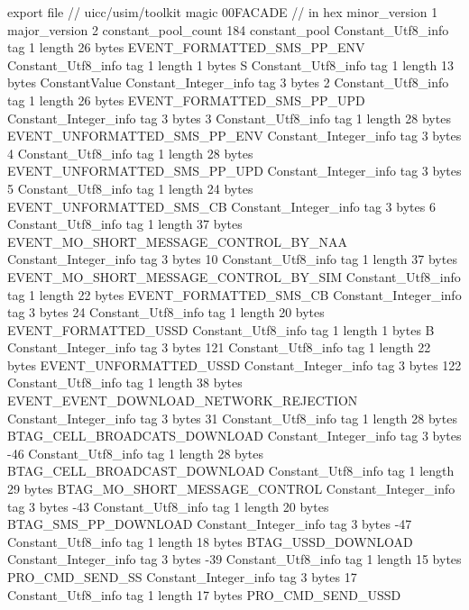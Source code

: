 export file {		// uicc/usim/toolkit
	magic	00FACADE		 // in hex
	minor_version	1
	major_version	2
	constant_pool_count	184
	constant_pool {
		Constant_Utf8_info {
			tag	1
			length	26
			bytes	EVENT_FORMATTED_SMS_PP_ENV
		}
		Constant_Utf8_info {
			tag	1
			length	1
			bytes	S
		}
		Constant_Utf8_info {
			tag	1
			length	13
			bytes	ConstantValue
		}
		Constant_Integer_info {
			tag	3
			bytes	2
		}
		Constant_Utf8_info {
			tag	1
			length	26
			bytes	EVENT_FORMATTED_SMS_PP_UPD
		}
		Constant_Integer_info {
			tag	3
			bytes	3
		}
		Constant_Utf8_info {
			tag	1
			length	28
			bytes	EVENT_UNFORMATTED_SMS_PP_ENV
		}
		Constant_Integer_info {
			tag	3
			bytes	4
		}
		Constant_Utf8_info {
			tag	1
			length	28
			bytes	EVENT_UNFORMATTED_SMS_PP_UPD
		}
		Constant_Integer_info {
			tag	3
			bytes	5
		}
		Constant_Utf8_info {
			tag	1
			length	24
			bytes	EVENT_UNFORMATTED_SMS_CB
		}
		Constant_Integer_info {
			tag	3
			bytes	6
		}
		Constant_Utf8_info {
			tag	1
			length	37
			bytes	EVENT_MO_SHORT_MESSAGE_CONTROL_BY_NAA
		}
		Constant_Integer_info {
			tag	3
			bytes	10
		}
		Constant_Utf8_info {
			tag	1
			length	37
			bytes	EVENT_MO_SHORT_MESSAGE_CONTROL_BY_SIM
		}
		Constant_Utf8_info {
			tag	1
			length	22
			bytes	EVENT_FORMATTED_SMS_CB
		}
		Constant_Integer_info {
			tag	3
			bytes	24
		}
		Constant_Utf8_info {
			tag	1
			length	20
			bytes	EVENT_FORMATTED_USSD
		}
		Constant_Utf8_info {
			tag	1
			length	1
			bytes	B
		}
		Constant_Integer_info {
			tag	3
			bytes	121
		}
		Constant_Utf8_info {
			tag	1
			length	22
			bytes	EVENT_UNFORMATTED_USSD
		}
		Constant_Integer_info {
			tag	3
			bytes	122
		}
		Constant_Utf8_info {
			tag	1
			length	38
			bytes	EVENT_EVENT_DOWNLOAD_NETWORK_REJECTION
		}
		Constant_Integer_info {
			tag	3
			bytes	31
		}
		Constant_Utf8_info {
			tag	1
			length	28
			bytes	BTAG_CELL_BROADCATS_DOWNLOAD
		}
		Constant_Integer_info {
			tag	3
			bytes	-46
		}
		Constant_Utf8_info {
			tag	1
			length	28
			bytes	BTAG_CELL_BROADCAST_DOWNLOAD
		}
		Constant_Utf8_info {
			tag	1
			length	29
			bytes	BTAG_MO_SHORT_MESSAGE_CONTROL
		}
		Constant_Integer_info {
			tag	3
			bytes	-43
		}
		Constant_Utf8_info {
			tag	1
			length	20
			bytes	BTAG_SMS_PP_DOWNLOAD
		}
		Constant_Integer_info {
			tag	3
			bytes	-47
		}
		Constant_Utf8_info {
			tag	1
			length	18
			bytes	BTAG_USSD_DOWNLOAD
		}
		Constant_Integer_info {
			tag	3
			bytes	-39
		}
		Constant_Utf8_info {
			tag	1
			length	15
			bytes	PRO_CMD_SEND_SS
		}
		Constant_Integer_info {
			tag	3
			bytes	17
		}
		Constant_Utf8_info {
			tag	1
			length	17
			bytes	PRO_CMD_SEND_USSD
}}}
